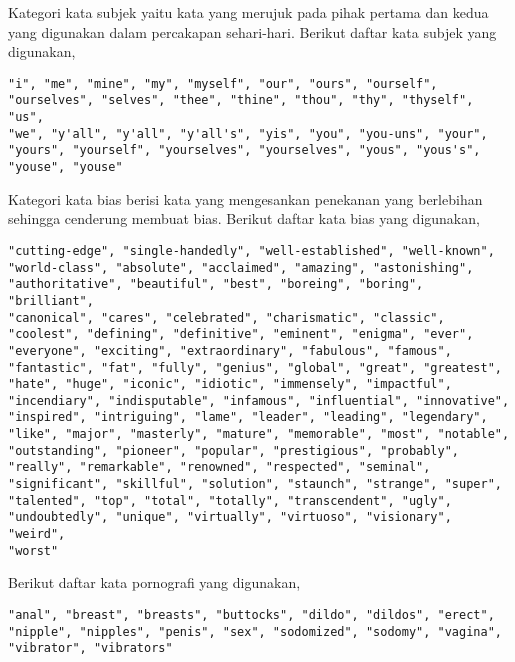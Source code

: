 \label{lampiran:words_pronoun}

Kategori kata subjek yaitu kata yang merujuk pada pihak pertama dan kedua yang
digunakan dalam percakapan sehari-hari.
Berikut daftar kata subjek yang digunakan,

\begin{lstlisting}
"i", "me", "mine", "my", "myself", "our", "ours", "ourself",
"ourselves", "selves", "thee", "thine", "thou", "thy", "thyself", "us",
"we", "y'all", "y'all", "y'all's", "yis", "you", "you-uns", "your",
"yours", "yourself", "yourselves", "yourselves", "yous", "yous's",
"youse", "youse"
\end{lstlisting}


\label{lampiran:words_bias}

Kategori kata bias berisi kata yang mengesankan penekanan yang berlebihan
sehingga cenderung membuat bias.
Berikut daftar kata bias yang digunakan,

\begin{lstlisting}
"cutting-edge", "single-handedly", "well-established", "well-known",
"world-class", "absolute", "acclaimed", "amazing", "astonishing",
"authoritative", "beautiful", "best", "boreing", "boring", "brilliant",
"canonical", "cares", "celebrated", "charismatic", "classic",
"coolest", "defining", "definitive", "eminent", "enigma", "ever",
"everyone", "exciting", "extraordinary", "fabulous", "famous",
"fantastic", "fat", "fully", "genius", "global", "great", "greatest",
"hate", "huge", "iconic", "idiotic", "immensely", "impactful",
"incendiary", "indisputable", "infamous", "influential", "innovative",
"inspired", "intriguing", "lame", "leader", "leading", "legendary",
"like", "major", "masterly", "mature", "memorable", "most", "notable",
"outstanding", "pioneer", "popular", "prestigious", "probably",
"really", "remarkable", "renowned", "respected", "seminal",
"significant", "skillful", "solution", "staunch", "strange", "super",
"talented", "top", "total", "totally", "transcendent", "ugly",
"undoubtedly", "unique", "virtually", "virtuoso", "visionary", "weird",
"worst"
\end{lstlisting}

\label{lampiran:words_sex}

Berikut daftar kata pornografi yang digunakan,

\begin{lstlisting}
"anal", "breast", "breasts", "buttocks", "dildo", "dildos", "erect",
"nipple", "nipples", "penis", "sex", "sodomized", "sodomy", "vagina",
"vibrator", "vibrators"
\end{lstlisting}

